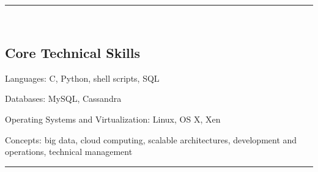 

\hrule\
\vspace{-0.4em}
\subsection*{Core Technical Skills}

\begin{indentsection}{\parindent}
	\begin{description*}
		\item[Languages:]
		C, Python, shell scripts, \textsc{SQL}
		\item[Databases:]
		My\textsc{SQL}, Cassandra
		\item[Operating Systems and Virtualization:]
		Linux, \textsc{OS X}, Xen
		\item[Concepts:]
		big data, cloud computing,  scalable architectures, development and operations, technical management
	\end{description*}
\end{indentsection}
\hrule\
\vspace{-0.4em}
